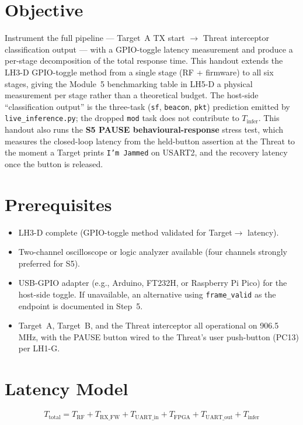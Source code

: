 \documentclass[11pt,letterpaper]{article}
\begin{document}

\section{Objective}
Instrument the full pipeline --- Target~A \mbox{TX} start $\to$ Threat interceptor classification output --- with a GPIO-toggle latency measurement and produce a per-stage decomposition of the total response time. This handout extends the LH3-D \mbox{GPIO}-toggle method from a single stage (\mbox{RF} + firmware) to all six stages, giving the Module~5 benchmarking table in LH5-D a physical measurement per stage rather than a theoretical budget. The host-side ``classification output'' is the three-task (\texttt{sf}, \texttt{beacon}, \texttt{pkt}) prediction emitted by \texttt{live\_inference.py}; the dropped \texttt{mod} task does not contribute to $T_{\text{infer}}$. This handout also runs the \textbf{S5 PAUSE behavioural-response} stress test, which measures the closed-loop latency from the held-button assertion at the Threat to the moment a Target prints \texttt{I'm Jammed} on USART2, and the recovery latency once the button is released.

\section{Prerequisites}
\begin{itemize}[leftmargin=2em]
	\item LH3-D complete (\mbox{GPIO}-toggle method validated for Target$\to$\FPGA{} latency).
	\item Two-channel oscilloscope or logic analyzer available (four channels strongly preferred for S5).
	\item USB-\mbox{GPIO} adapter (e.g., Arduino, FT232H, or Raspberry Pi Pico) for the host-side toggle. If unavailable, an alternative using \texttt{frame\_valid} as the endpoint is documented in Step~5.
	\item Target~A, Target~B, and the Threat interceptor all operational on 906.5\,MHz, with the PAUSE button wired to the Threat's user push-button (PC13) per LH1-G.
\end{itemize}

\section{Latency Model}
\[
	T_{\text{total}} = T_{\text{RF}} + T_{\text{RX\_FW}} + T_{\text{UART\_in}} + T_{\text{FPGA}} + T_{\text{UART\_out}} + T_{\text{infer}}
\]
\end{document}
